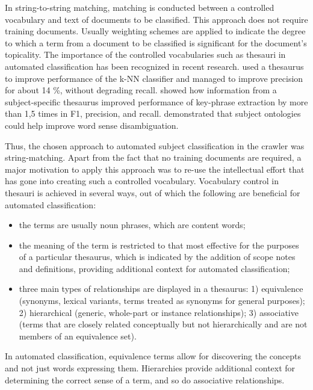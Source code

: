 In string-to-string matching, matching is conducted between a controlled vocabulary and text of documents to be classified. This approach does not require training documents. Usually weighting schemes are applied to indicate the degree to which a term from a document to be classified is significant for the document's topicality. The importance of the controlled vocabularies such as thesauri in automated classification has been recognized in recent research. \cite{Bang_etal_06} used a thesaurus to improve performance of the k-NN classifier and managed to improve precision for about 14 \%, without degrading recall. \cite{Medelyan_06} showed how information from a subject-specific thesaurus improved performance of key-phrase extraction by more than 1,5 times in F1, precision, and recall. \cite{Garces_etal_06} demonstrated that subject ontologies could help improve word sense disambiguation.

Thus, the chosen approach to automated subject classification in the crawler was string-matching. Apart from the fact that no training documents are required, a major motivation to apply this approach was to re-use the intellectual effort that has gone into creating such a controlled vocabulary. Vocabulary control in thesauri is achieved in several ways, out of which the following are beneficial for automated classification:
\begin{itemize}
\item the terms are usually noun phrases, which are content words;
\item the meaning of the term is restricted to that most effective for the purposes of a particular thesaurus, which is indicated by the addition of scope notes and definitions, providing additional context for automated classification;
\item three main types of relationships are displayed in a thesaurus:
 1) equivalence (synonyms, lexical variants, terms treated as synonyms for general purposes); 2) hierarchical (generic, whole-part or instance relationships); 3) associative (terms that are closely related conceptually but not hierarchically and are not members of an equivalence set). 
\end{itemize}
In automated classification, equivalence terms allow for discovering the concepts and not just words expressing them. Hierarchies provide additional context for determining the correct sense of a term, and so do associative relationships.

